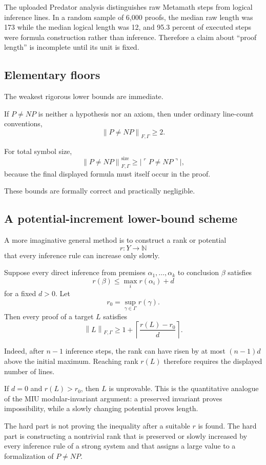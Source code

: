 \documentclass[11pt,letterpaper]{article}
\theoremstyle{named}
\newcommand{\prooflen}[2]{\left\lVert #1\right\rVert_{#2}}
\begin{document}
The uploaded Predator analysis distinguishes raw Metamath steps from logical inference lines. In a random sample of 6,000 proofs, the median raw length was 173 while the median logical length was 12, and 95.3 percent of executed steps were formula construction rather than inference. Therefore a claim about ``proof length'' is incomplete until its unit is fixed.

\subsection{Elementary floors}

The weakest rigorous lower bounds are immediate.

If $P\ne NP$ is neither a hypothesis nor an axiom, then under ordinary line-count conventions,
\[
\prooflen{P\ne NP}{F,\Gamma}\ge 2.
\]

For total symbol size,
\[
\prooflen{P\ne NP}{F,\Gamma}^{\mathrm{size}}
\ge
|\ulcorner P\ne NP\urcorner|,
\]
because the final displayed formula must itself occur in the proof.

These bounds are formally correct and practically negligible.

\subsection{A potential-increment lower-bound scheme}

A more imaginative general method is to construct a rank or potential
\[
r:Y\longrightarrow\mathbb N
\]
that every inference rule can increase only slowly.

Suppose every direct inference from premises $\alpha_1,\ldots,\alpha_k$ to conclusion $\beta$ satisfies
\[
r(\beta)
\le
\max_i r(\alpha_i)+d
\]
for a fixed $d>0$. Let
\[
r_0=\sup_{\gamma\in\Gamma}r(\gamma).
\]
Then every proof of a target $L$ satisfies
\[
\boxed{
\prooflen{L}{F,\Gamma}
\ge
1+
\left\lceil
\frac{r(L)-r_0}{d}
\right\rceil
}.
\]

Indeed, after $n-1$ inference steps, the rank can have risen by at most $(n-1)d$ above the initial maximum. Reaching rank $r(L)$ therefore requires the displayed number of lines.

If $d=0$ and $r(L)>r_0$, then $L$ is unprovable. This is the quantitative analogue of the MIU modular-invariant argument: a preserved invariant proves impossibility, while a slowly changing potential proves length.

The hard part is not proving the inequality after a suitable $r$ is found. The hard part is constructing a nontrivial rank that is preserved or slowly increased by every inference rule of a strong system and that assigns a large value to a formalization of $P\ne NP$.
\end{document}
